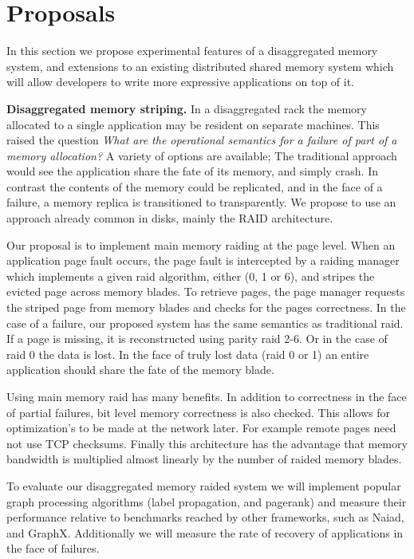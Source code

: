\section{Proposals}
\label{sec:proposal}
In this section we propose experimental features of a disaggregated
memory system, and extensions to an existing distributed shared memory
system which will allow developers to write more expressive
applications on top of it.


\textbf{Disaggregated memory striping.} In a disaggregated
rack the memory allocated to a single application may be resident on
separate machines. This raised the question \emph{What are the operational
semantics for a failure of part of a memory allocation?} A variety of
options are available; The traditional approach would see the
application share the fate of its memory, and simply crash. In
contrast the contents of the memory could be replicated, and in the
face of a failure, a memory replica is transitioned to transparently.
We propose to use an approach already common in disks, mainly the RAID
architecture.

Our proposal is to implement main memory raiding at the page level.
When an application page fault occurs, the page fault is intercepted
by a raiding manager which implements a given raid algorithm, either
(0, 1 or 6), and stripes the evicted page across memory blades. To
retrieve pages, the page manager requests the striped page from memory
blades and checks for the pages correctness. In the case of a failure,
our proposed system has the same semantics as traditional raid. If a
page is missing, it is reconstructed using parity raid 2-6. Or in the
case of raid 0 the data is lost. In the face of truly lost data (raid
0 or 1) an entire application should share the fate of the memory
blade.

Using main memory raid has many benefits. In addition to correctness
in the face of partial failures, bit level memory correctness is also
checked.  This allows for optimization's to be made at the network
later. For example remote pages need not use TCP checksums. Finally
this architecture has the advantage that memory bandwidth is
multiplied almost linearly by the number of raided memory blades.

To evaluate our disaggregated memory raided system we will implement
popular graph processing algorithms (label propagation, and pagerank)
and measure their performance relative to benchmarks reached by other
frameworks, such as Naiad, and GraphX. Additionally we will measure
the rate of recovery of applications in the face of failures. 

